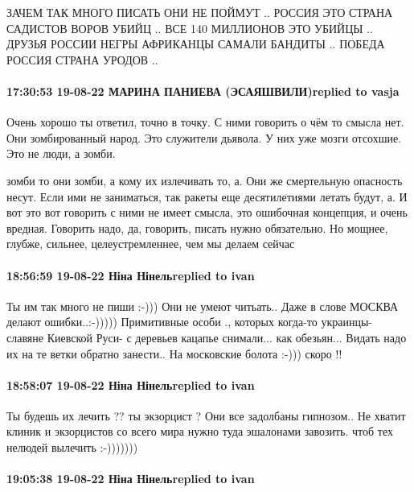 ЗАЧЕМ ТАК МНОГО ПИСАТЬ ОНИ НЕ ПОЙМУТ .. РОССИЯ ЭТО СТРАНА САДИСТОВ ВОРОВ УБИЙЦ
.. ВСЕ 140 МИЛЛИОНОВ ЭТО УБИЙЦЫ .. ДРУЗЬЯ РОССИИ НЕГРЫ АФРИКАНЦЫ САМАЛИ БАНДИТЫ
.. ПОБЕДА РОССИЯ СТРАНА УРОДОВ ..

\paragraph{17:30:53 19-08-22 МАРИНА ПАНИЕВА (ЭСАЯШВИЛИ)replied to vasja}

Очень хорошо ты ответил, точно в точку. С ними говорить о чём то смысла нет.
Они зомбированный народ. Это служители дьявола. У них уже мозги отсохшие. Это
не люди, а зомби.


зомби то они зомби, а кому их излечивать то, а. Они же смертельную опасность
несут. Если ими не заниматься, так ракеты еще десятилетиями летать будут, а. И
вот это вот говорить с ними не имеет смысла, это ошибочная концепция, и очень
вредная. Говорить надо, да, говорить, писать нужно обязательно. Но мощнее,
глубже, сильнее, целеустремленнее, чем мы делаем сейчас

\paragraph{18:56:59 19-08-22 Ніна Нінельreplied to ivan}

Ты им так много не пиши :-))) Они не умеют читьать.. Даже в слове МОСКВА делают
ошибки..:-))))) Примитивные особи  ., которых когда-то украинцы- славяне
Киевской Руси- с деревьев кацапье снимали... как обезьян... Видать надо их на
те ветки обратно занести.. На московские болота :-))) скоро !!


\paragraph{18:58:07 19-08-22 Ніна Нінельreplied to ivan}

Ты будешь их лечить ?? ты экзорцист ? Они все задолбаны гипнозом.. Не хватит
клиник и экзорцистов со всего мира нужно туда эшалонами завозить. чтоб тех
нелюдей вылечить :-)))))))

\paragraph{19:05:38 19-08-22 Ніна Нінельreplied to ivan}

